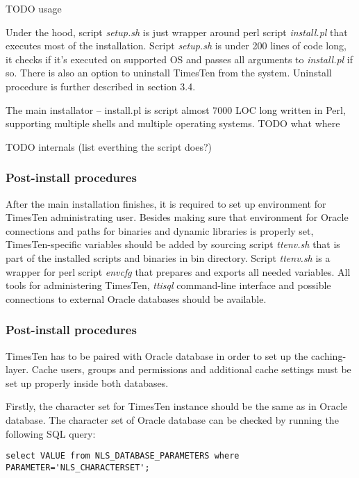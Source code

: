 \documentclass[11pt, letterpaper]{article}
\begin{document}
TODO usage

Under the hood, script \emph{setup.sh} is just wrapper around perl script \emph{install.pl} that executes most of the installation. Script \emph{setup.sh} is under 200 lines of code long, it checks if it’s executed on supported OS and passes all arguments to \emph{install.pl} if so. There is also an option to uninstall TimesTen from the system. Uninstall procedure is further described in section 3.4.

The main installator – install.pl is script almost 7000 LOC long written in Perl, supporting multiple shells and multiple operating systems. TODO what where

TODO internals (list everthing the script does?)

\subsubsection{Post-install procedures}

After the main installation finishes, it is required to set up environment for TimesTen administrating user. Besides making sure that environment for Oracle connections and paths for binaries and dynamic libraries is properly set, TimesTen-specific variables should be added by sourcing script \emph{ttenv.sh} that is part of the installed scripts and binaries in bin directory. Script \emph{ttenv.sh} is a wrapper for perl script \emph{envcfg} that prepares and exports all needed variables. All tools for administering TimesTen, \emph{ttisql} command-line interface and possible connections to external Oracle databases should be available.

\subsubsection{Post-install procedures}

TimesTen has to be paired with Oracle database in order to set up the caching-layer. Cache users, groups and permissions  and additional cache settings must be set up properly inside both databases.

Firstly, the character set for TimesTen instance should be the same as in Oracle database. The character set of Oracle database can be checked by running the following SQL query:

\begin{lstlisting}
select VALUE from NLS_DATABASE_PARAMETERS where PARAMETER='NLS_CHARACTERSET';
\end{lstlisting}
\end{document}
